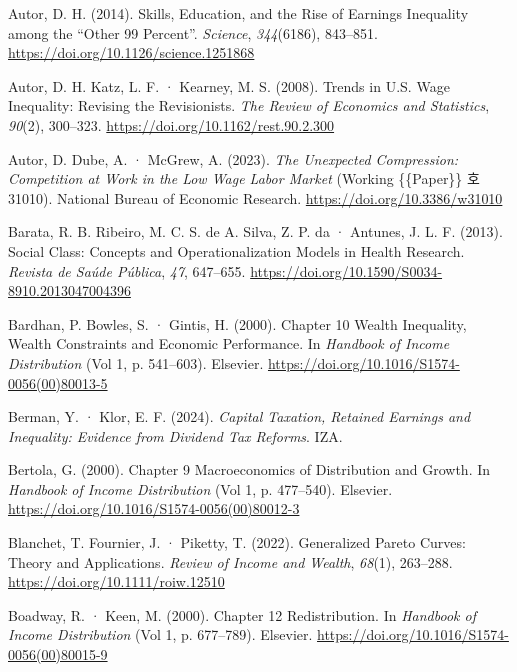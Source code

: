 \documentclass[
  letterpaper,
  DIV=11,
  numbers=noendperiod]{scrartcl}
\newlength{\cslhangindent}
\newenvironment{CSLReferences}[2] %
 {\begin{list}{}{%
  \setlength{\itemindent}{0pt}
  \setlength{\leftmargin}{0pt}
  \setlength{\parsep}{0pt}
  \ifodd #1
   \setlength{\leftmargin}{\cslhangindent}
   \setlength{\itemindent}{-1\cslhangindent}
  \fi
  \setlength{\itemsep}{#2\baselineskip}}}
 {\end{list}}
\begin{document}
\begin{CSLReferences}{1}{0}
Autor, D. H. (2014). Skills, Education, and the Rise of Earnings
Inequality among the {``Other 99 Percent''}. \emph{Science},
\emph{344}(6186), 843--851.
\url{https://doi.org/10.1126/science.1251868}

Autor, D. H. Katz, L. F. · Kearney, M. S. (2008). Trends in {U}.{S}.
{Wage Inequality}: {Revising} the {Revisionists}. \emph{The Review of
Economics and Statistics}, \emph{90}(2), 300--323.
\url{https://doi.org/10.1162/rest.90.2.300}

Autor, D. Dube, A. · McGrew, A. (2023). \emph{The {Unexpected
Compression}: {Competition} at {Work} in the {Low Wage Labor Market}}
(Working \{\{Paper\}\} 호 31010). National Bureau of Economic Research.
\url{https://doi.org/10.3386/w31010}

Barata, R. B. Ribeiro, M. C. S. de A. Silva, Z. P. da · Antunes, J. L.
F. (2013). Social Class: Concepts and Operationalization Models in
Health Research. \emph{Revista de Saúde Pública}, \emph{47}, 647--655.
\url{https://doi.org/10.1590/S0034-8910.2013047004396}

Bardhan, P. Bowles, S. · Gintis, H. (2000). Chapter 10 {Wealth}
Inequality, Wealth Constraints and Economic Performance. In
\emph{Handbook of {Income Distribution}} (Vol 1, p. 541--603). Elsevier.
\url{https://doi.org/10.1016/S1574-0056(00)80013-5}

Berman, Y. · Klor, E. F. (2024). \emph{Capital {Taxation}, {Retained
Earnings} and {Inequality}: {Evidence} from {Dividend Tax Reforms}}.
IZA.

Bertola, G. (2000). Chapter 9 {Macroeconomics} of Distribution and
Growth. In \emph{Handbook of {Income Distribution}} (Vol 1, p.
477--540). Elsevier. \url{https://doi.org/10.1016/S1574-0056(00)80012-3}

Blanchet, T. Fournier, J. · Piketty, T. (2022). Generalized {Pareto
Curves}: {Theory} and {Applications}. \emph{Review of Income and
Wealth}, \emph{68}(1), 263--288.
\url{https://doi.org/10.1111/roiw.12510}

Boadway, R. · Keen, M. (2000). Chapter 12 {Redistribution}. In
\emph{Handbook of {Income Distribution}} (Vol 1, p. 677--789). Elsevier.
\url{https://doi.org/10.1016/S1574-0056(00)80015-9}


\end{CSLReferences}
\end{document}
